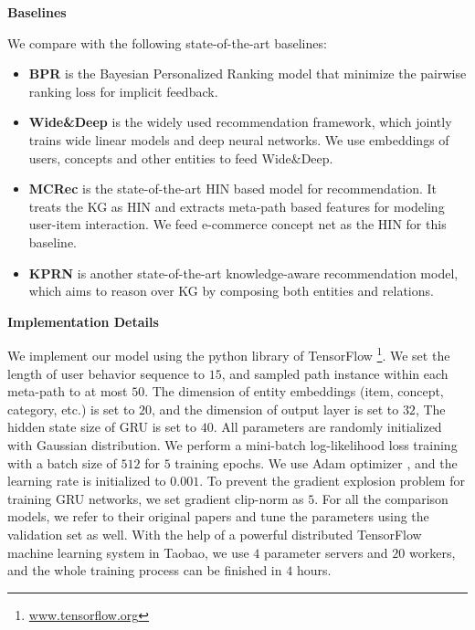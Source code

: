 \noindent
\textbf{Baselines}

\noindent
We compare with the following state-of-the-art baselines:
\begin{itemize}
	\itemsep0em
	\item \textbf{BPR} \cite{rendle2009bpr} is the Bayesian Personalized Ranking model that minimize the pairwise ranking loss for implicit feedback.
	\item \textbf{Wide\&Deep} \cite{cheng2016wide} is the widely used recommendation framework, which jointly trains wide linear models and deep neural networks. We use embeddings of users, concepts and other entities to feed Wide\&Deep.
	\item \textbf{MCRec} \cite{hu2018leveraging} is the state-of-the-art HIN based model for recommendation. It treats the KG as HIN and extracts meta-path based features for modeling user-item interaction. 
	We feed e-commerce concept net as the HIN for this baseline.
	\item \textbf{KPRN} \cite{wang2018explainable} is another state-of-the-art knowledge-aware recommendation model, which aims to reason over KG by composing both entities and relations. 
\end{itemize}

\noindent
\textbf{Implementation Details}

\noindent
We implement our model using the python library of TensorFlow \footnote{\url{www.tensorflow.org}}. 
We set the length of user behavior sequence to $15$,
and sampled path instance within each meta-path to at most $50$.
The dimension of entity embeddings (item, concept, category, etc.) is set to $20$, 
and the dimension of output layer is set to $32$,
The hidden state size of GRU is set to $40$.
All parameters are randomly initialized with Gaussian distribution.
We perform a mini-batch log-likelihood loss training with a batch size of $512$ for $5$ training epochs.
We use Adam optimizer \cite{kingma2014adam}, and the learning rate is initialized to $0.001$.
To prevent the gradient explosion problem for training GRU networks,
we set gradient clip-norm as $5$.
For all the comparison models, 
we refer to their original papers and tune the parameters using the validation set as well.
With the help of a powerful distributed TensorFlow machine learning system in Taobao, 
we use $4$ parameter servers and $20$ workers,
and the whole training process can be finished in $4$ hours.

